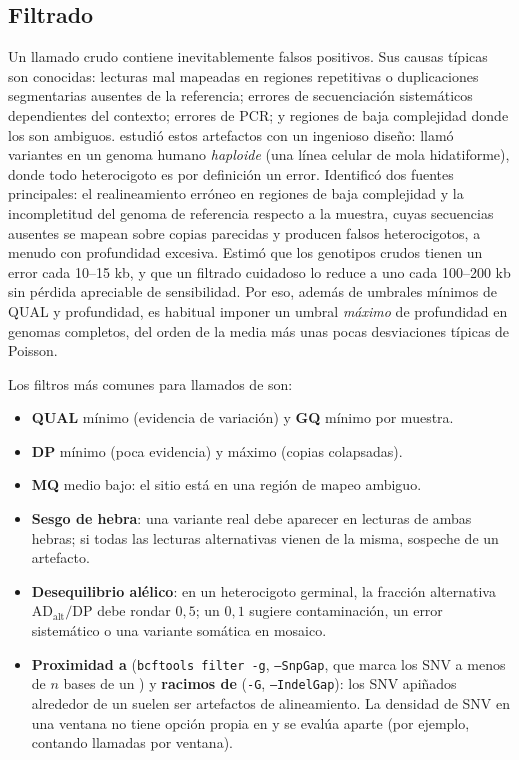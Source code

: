 \subsection{Filtrado}

Un llamado crudo contiene inevitablemente falsos positivos. Sus causas típicas son conocidas: lecturas mal mapeadas en regiones repetitivas o duplicaciones segmentarias ausentes de la referencia; errores de secuenciación sistemáticos dependientes del contexto; errores de PCR; y regiones de baja complejidad donde los  son ambiguos. \textcite{c09-li2014} estudió estos artefactos con un ingenioso diseño: llamó variantes en un genoma humano \emph{haploide} (una línea celular de mola hidatiforme), donde todo heterocigoto es por definición un error. Identificó dos fuentes principales: el realineamiento erróneo en regiones de baja complejidad y la incompletitud del genoma de referencia respecto a la muestra, cuyas secuencias ausentes se mapean sobre copias parecidas y producen falsos heterocigotos, a menudo con profundidad excesiva. Estimó que los genotipos crudos tienen un error cada 10--15 kb, y que un filtrado cuidadoso lo reduce a uno cada 100--200 kb sin pérdida apreciable de sensibilidad. Por eso, además de umbrales mínimos de QUAL y profundidad, es habitual imponer un umbral \emph{máximo} de profundidad en genomas completos, del orden de la media más unas pocas desviaciones típicas de Poisson.

Los filtros más comunes para llamados de  son:
\begin{itemize}
  \item \textbf{QUAL} mínimo (evidencia de variación) y \textbf{GQ} mínimo por muestra.
  \item \textbf{DP} mínimo (poca evidencia) y máximo (copias colapsadas).
  \item \textbf{MQ} medio bajo: el sitio está en una región de mapeo ambiguo.
  \item \textbf{Sesgo de hebra}: una variante real debe aparecer en lecturas de ambas hebras; si todas las lecturas alternativas vienen de la misma, sospeche de un artefacto.
  \item \textbf{Desequilibrio alélico}: en un heterocigoto germinal, la fracción alternativa $\mathrm{AD}_\text{alt}/\mathrm{DP}$ debe rondar $0{,}5$; un $0{,}1$ sugiere contaminación, un error sistemático o una variante somática en mosaico.
  \item \textbf{Proximidad a } (\texttt{bcftools filter -g}, \texttt{--SnpGap}, que marca los SNV a menos de $n$ bases de un ) y \textbf{racimos de } (\texttt{-G}, \texttt{--IndelGap}): los SNV apiñados alrededor de un  suelen ser artefactos de alineamiento. La densidad de SNV en una ventana no tiene opción propia en  y se evalúa aparte (por ejemplo, contando llamadas por ventana).
\end{itemize}

